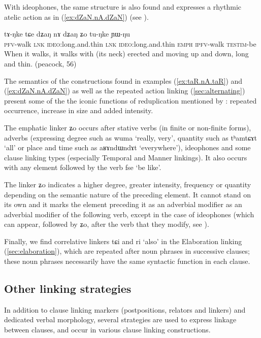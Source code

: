 \documentclass[oldfontcommands,oneside,a4paper,11pt]{article}
\newcommand{\ipa}[1]{{\phon \mbox{#1}}} %
\newcommand{\refb}[1]{(\ref{#1})}
\begin{document}
With  ideophones, the same structure  is also found and expresses a rhythmic atelic action as in \refb{ex:dZaN.nA.dZaN} (see \citealt{japhug14ideophones}).
 
 \begin{exe}
\ex \label{ex:dZaN.nA.dZaN} 
\gll
\ipa{tɤ-ŋke}   	\ipa{tɕe}   	\ipa{dʑaŋ} \ipa{nɤ}   	\ipa{dʑaŋ}   	\ipa{ʑo}   	\ipa{tu-ŋke}   	\ipa{ɲɯ-ŋu}   \\
\textsc{pfv}-walk \textsc{lnk} \textsc{ideo}:long.and.thin \textsc{lnk}  \textsc{ideo}:long.and.thin \textsc{emph} \textsc{ipfv}-walk \textsc{testim}-be \\
\glt When it walks, it walks with (its neck) erected and moving up and down, long and thin. (peacock, 56)
\end{exe}

The semantics of the constructions found in examples \refb{ex:taR.nA.taR}  and \refb{ex:dZaN.nA.dZaN} as well as the   repeated action linking  \refb{sec:alternating} present some of the the iconic functions of reduplication mentioned by \citet[76]{sapir21lg}: repeated occurrence, increase in size and added intensity.

The emphatic linker \ipa{ʑo} occurs after stative verbs (in finite or non-finite forms), adverbs (expressing degree such as \ipa{wuma} `really, very', quantity such as \ipa{tʰamtɕɤt} `all' or place and time such as \ipa{aʁɤndɯndɤt} `everywhere'),  ideophones and some clause linking types (especially Temporal and Manner linkings). It also occurs with any element followed by the verb \ipa{fse} `be like'. 

The linker \ipa{ʑo} indicates a higher degree, greater  intensity, frequency or quantity depending on the semantic nature of the preceding element. It cannot stand on its own  and it marks   the element preceding it as an adverbial modifier as an adverbial modifier of the following verb, except in the case of ideophones (which can appear, followed by \ipa{ʑo}, after the verb that they modify, see \citealt{japhug14ideophones}).


Finally, we find correlative linkers   \ipa{tɕi} and \ipa{ri} `also' in the Elaboration linking \refb{sec:elaboration}, which are repeated after  noun phrases in successive clauses; these noun phrases necessarily have the same syntactic function in each clause.



\subsection{Other linking strategies}
In addition to clause linking markers (postpositions, relators and linkers) and dedicated verbal morphology, several strategies are used to express linkage between clauses, and occur in various clause linking constructions.  
\end{document}
